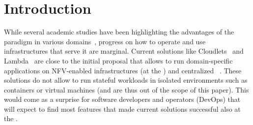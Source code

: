 \vspace*{-.2cm}
\section{Introduction}
\label{sec:intro}

\vspace*{-.1cm}


While several academic studies have been highlighting the advantages
of the \edgecomputing paradigm in various
domains~\cite{bonomi2012fog,satyanarayanan2017emergence,shi2016edge,yi2015fog,zhang2015cloud},
progress on how to operate and use infrastructures that serve it are marginal.
Current solutions like Cloudlets~\cite{akamai:cloudlets} and
Lambda~\cite{amazon:lambda-edge} are close to the initial \fog proposal that
allows to run domain-specific applications on NFV-enabled infrastructures (at
the \edge) and centralized \clouds~\cite{bonomi2012fog}.
These solutions do not allow to run stateful workloads in isolated environments
such as containers or virtual machines (and are thus out of the scope of this
paper).
%
This would come as a surprise for software developers and operators (DevOps)
that will expect to find most features that made current \cloudcomputing
solutions successful also at the \edge.



